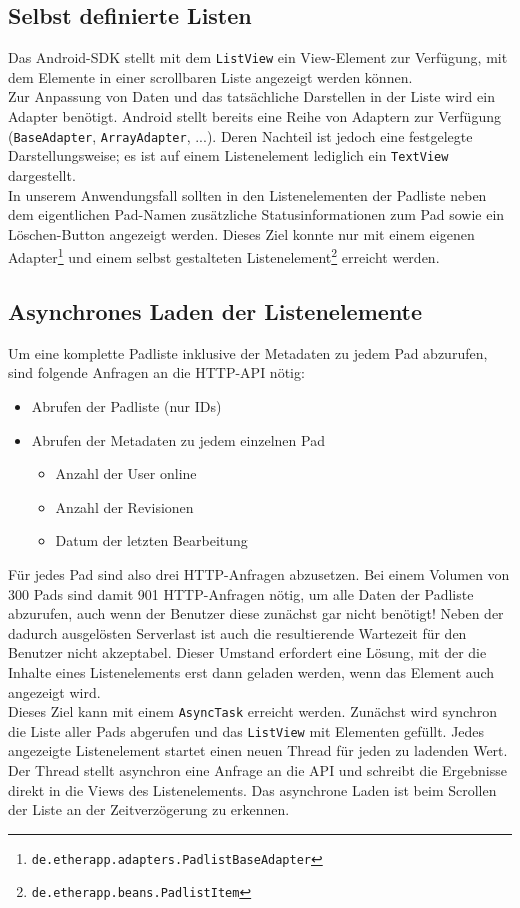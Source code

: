 \subsection{Selbst definierte Listen}
Das Android-SDK stellt mit dem \texttt{ListView} ein View-Element zur Verfügung, mit dem Elemente in einer scrollbaren Liste angezeigt werden können.\\
Zur Anpassung von Daten und das tatsächliche Darstellen in der Liste wird ein Adapter benötigt.
Android stellt bereits eine Reihe von Adaptern zur Verfügung (\texttt{BaseAdapter}, \texttt{ArrayAdapter}, ...).
Deren Nachteil ist jedoch eine festgelegte Darstellungsweise; es ist auf einem Listenelement lediglich ein \texttt{TextView} dargestellt.\\
In unserem Anwendungsfall sollten in den Listenelementen der Padliste neben dem eigentlichen Pad-Namen zusätzliche Statusinformationen zum Pad sowie ein Löschen-Button angezeigt werden.
Dieses Ziel konnte nur mit einem eigenen Adapter\footnote{\texttt{de.etherapp.adapters.PadlistBaseAdapter}} und einem selbst gestalteten Listenelement\footnote{\texttt{de.etherapp.beans.PadlistItem}} erreicht werden.\\


\subsection{Asynchrones Laden der Listenelemente}
Um eine komplette Padliste inklusive der Metadaten zu jedem Pad abzurufen, sind folgende Anfragen an die HTTP-API nötig:
\begin{itemize}
	\item Abrufen der Padliste (nur IDs)
	\item Abrufen der Metadaten zu jedem einzelnen Pad
		\begin{itemize}
			\item Anzahl der User online
			\item Anzahl der Revisionen
			\item Datum der letzten Bearbeitung
		\end{itemize}
\end{itemize}

Für jedes Pad sind also drei HTTP-Anfragen abzusetzen.
Bei einem Volumen von 300 Pads sind damit 901 HTTP-Anfragen nötig, um alle Daten der Padliste abzurufen, auch wenn der Benutzer diese zunächst gar nicht benötigt! Neben der dadurch ausgelösten Serverlast ist auch die resultierende Wartezeit für den Benutzer nicht akzeptabel.
Dieser Umstand erfordert eine Lösung, mit der die Inhalte eines Listenelements erst dann geladen werden, wenn das Element auch angezeigt wird.\\
Dieses Ziel kann mit einem \texttt{AsyncTask} erreicht werden.
Zunächst wird synchron die Liste aller Pads abgerufen und das \texttt{ListView} mit Elementen gefüllt. Jedes angezeigte Listenelement startet einen neuen Thread für jeden zu ladenden Wert.
Der Thread stellt asynchron eine Anfrage an die API und schreibt die Ergebnisse direkt in die Views des Listenelements.
Das asynchrone Laden ist beim Scrollen der Liste an der Zeitverzögerung zu erkennen.


